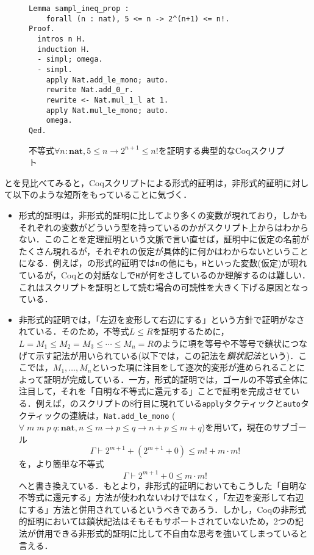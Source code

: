 \documentclass[submit]{ipsj}
\begin{document}
\begin{figure}[t]
\begin{mdframed}
\begin{verbatim}
Lemma sampl_ineq_prop :
    forall (n : nat), 5 <= n -> 2^(n+1) <= n!.
Proof.
  intros n H.
  induction H.
  - simpl; omega.
  - simpl.
    apply Nat.add_le_mono; auto.
    rewrite Nat.add_0_r.
    rewrite <- Nat.mul_1_l at 1.
    apply Nat.mul_le_mono; auto.
    omega.
Qed. 
\end{verbatim}
\end{mdframed}
\caption{不等式$\forall n : \mathbf{nat} \mathrel{,} 5 \leq n \to 2^{n + 1} \leq n!$を証明する典型的なCoqスクリプト}
\label{fig:ineq_sample_normal_notation}
\end{figure}
とを見比べてみると，Coqスクリプトによる形式的証明は，非形式的証明に対して以下のような短所をもっていることに気づく．
\begin{itemize}
\item 形式的証明は，非形式的証明に比してより多くの変数が現れており，しかもそれぞれの変数がどういう型を持っているのかがスクリプト上からはわからない．このことを定理証明という文脈で言い直せば，証明中に仮定の名前がたくさん現れるが，それぞれの仮定が具体的に何かはわからないということになる．例えば，の形式的証明では\verb+n+の他にも，\verb+H+といった変数(仮定)が現れているが，Coqとの対話なしで\verb+H+が何をさしているのか理解するのは難しい．これはスクリプトを証明として読む場合の可読性を大きく下げる原因となっている．
\item 非形式的証明では，「左辺を変形して右辺にする」という方針で証明がなされている．そのため，不等式$L \leq R$を証明するために，$L = M_1 \leq M_2 = M_3 \leq \cdots \leq M_n = R$のように項を等号や不等号で鎖状につなげて示す記法が用いられている(以下では，この記法を\emph{鎖状記法}という)．ここでは，$M_1, \ldots , M_n$といった項に注目をして逐次的変形が進められることによって証明が完成している．一方，形式的証明では，ゴールの不等式全体に注目して，それを「自明な不等式に還元する」ことで証明を完成させている．例えば，のスクリプトの8行目に現れている\verb+apply+タクティックと\verb+auto+タクティックの連続は，\verb+Nat.add_le_mono+ ($\forall \; m \; m \; p \; q : \mathbf{nat} \mathrel{,} n \leq m \to p \leq q \to n + p \leq m + q$)を用いて，現在のサブゴール
\[
\varGamma \vdash 2^{m + 1} + (2^{m + 1} +0) \leq m! + m \cdot m!
\]
を，より簡単な不等式
\[
\varGamma \vdash 2^{m + 1} + 0 \leq m \cdot m!
\]
へと書き換えている．もとより，非形式的証明においてもこうした「自明な不等式に還元する」方法が使われないわけではなく，「左辺を変形して右辺にする」方法と併用されているというべきであろう．しかし，Coqの非形式的証明においては鎖状記法はそもそもサポートされていないため，2つの記法が併用できる非形式的証明に比して不自由な思考を強いてしまっていると言える．
\end{itemize}
\end{document}
